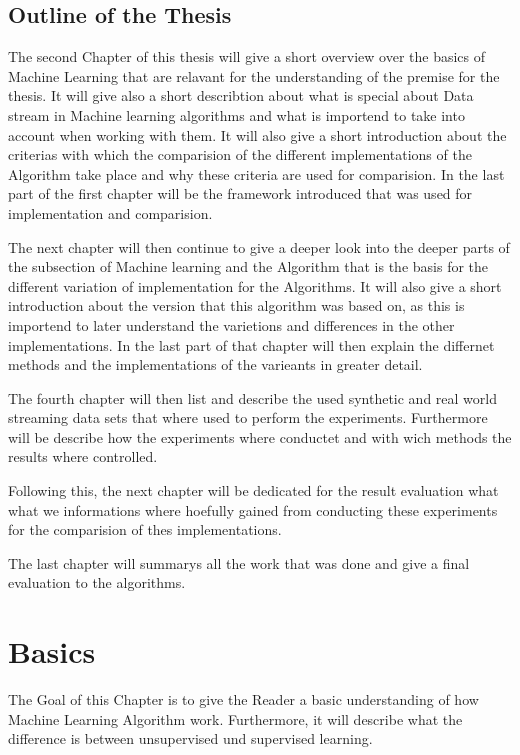 \documentclass[12pt,oneside,a4paper,parskip]{scrbook}
\begin{document}
\section{Outline of the Thesis} 

The second Chapter of this thesis will give a short overview over the basics of Machine Learning that are relavant for
the understanding of the premise for the thesis. It will give also a short describtion about what is special about Data stream 
in Machine learning algorithms and what is importend to take into account when working with them.
It will also give a short introduction about the criterias with which the comparision of the different implementations 
of the Algorithm take place and why these criteria are used for  comparision.
In the last part of the first chapter will be the framework introduced that was used for implementation and comparision.

The next chapter will then continue to give a deeper look into the deeper parts of the subsection of Machine learning 
and the Algorithm that is the basis for the different variation of implementation for the Algorithms.
It will also give a short introduction about the version that this algorithm was based on, as this is importend to later understand
the varietions and differences in the other implementations.
In the last part of that chapter will then explain the differnet methods and the implementations of the varieants in greater detail.

The fourth chapter will then list and describe the used synthetic and real world streaming data sets that where used to 
perform the experiments.
Furthermore will be describe how the experiments where conductet and with wich methods the results where controlled.

Following this, the next chapter will be dedicated for the result evaluation what what we informations where hoefully gained
from conducting these experiments for the comparision of thes implementations.

The last chapter will summarys all the work that was done and give a final evaluation to the algorithms.

\chapter{Basics}
The Goal of this Chapter is to give the Reader a basic understanding of how Machine Learning Algorithm work. 
Furthermore, it will describe what the difference is between unsupervised und supervised learning. 
\end{document}
